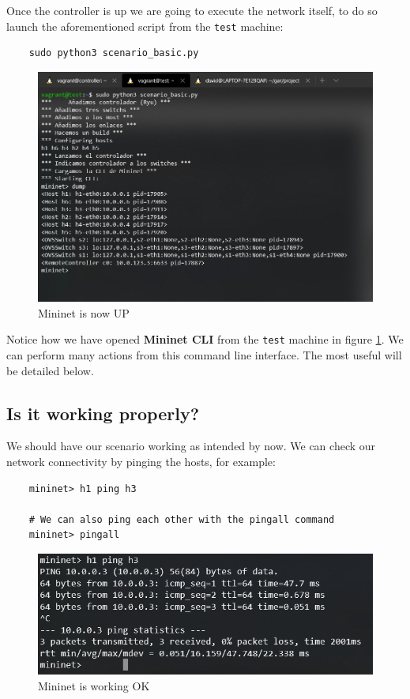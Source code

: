 \documentclass[12pt]{article}
\begin{document}
		Once the controller is up we are going to execute the network itself, to do so launch the aforementioned script from the \texttt{test} machine:

		\begin{verbatim}
	sudo python3 scenario_basic.py
		\end{verbatim}

        \newpage
		\begin{figure}[!htb]
			\centering
			\includegraphics[width=\linewidth]{mininet_up.png}
			\caption{Mininet is now UP}
			\label{f:mininet_up}
		\end{figure}

		Notice how we have opened \textbf{Mininet CLI} from the \texttt{test} machine in figure \ref{f:mininet_up}. We can perform many actions from this command line interface. The most useful will be detailed below.

	\subsection{Is it working properly?}
		We should have our scenario working as intended by now. We can check our network connectivity by pinging the hosts, for example:

		\begin{verbatim}
	mininet> h1 ping h3

	# We can also ping each other with the pingall command
	mininet> pingall
		\end{verbatim}

		\begin{figure}
			\centering
			\includegraphics[width=\linewidth]{ping_ok.png}
			\caption{Mininet is working OK}
			\label{f:ping_ok}
		\end{figure}
\end{document}
